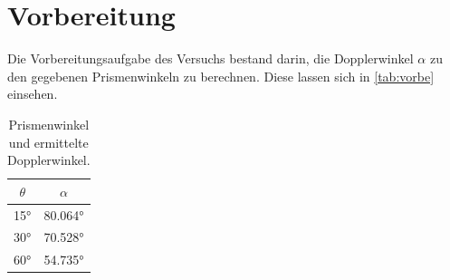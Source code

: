 \section{Vorbereitung}
\label{sec:Vorbereitung}

Die Vorbereitungsaufgabe des Versuchs bestand darin, die Dopplerwinkel $\alpha$ zu den gegebenen 
Prismenwinkeln zu berechnen. Diese lassen sich in \autoref{tab:vorbe} einsehen.

\begin{table}
    \centering
    \caption{Prismenwinkel und ermittelte Dopplerwinkel.}
    \begin{tabular}{cc}
        \toprule
        {$\theta$} & {$\alpha$}\\
        \midrule
        15° & 80.064°\\
        30° & 70.528°\\
        60° & 54.735°\\
        \bottomrule
    \end{tabular}
    \label{tab:vorbe}
\end{table}

